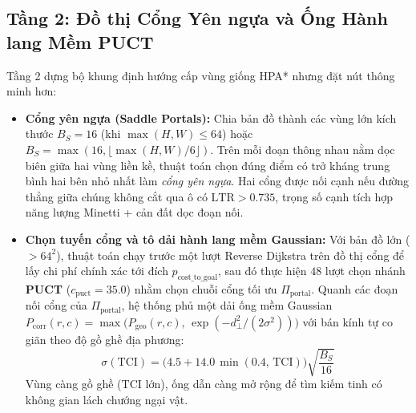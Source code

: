 \documentclass[12pt, a4paper]{article}
\begin{document}
\subsection{Tầng 2: Đồ thị Cổng Yên ngựa và Ống Hành lang Mềm PUCT}
Tầng 2 dựng bộ khung định hướng cấp vùng giống HPA* \cite{botea2004} nhưng đặt nút thông minh hơn:
\begin{itemize}
    \item \textbf{Cổng yên ngựa (Saddle Portals):} Chia bản đồ thành các vùng lớn kích thước $B_S = 16$ (khi $\max(H,W) \le 64$) hoặc $B_S = \max(16, \lfloor \max(H,W)/6 \rfloor)$. Trên mỗi đoạn thông nhau nằm dọc biên giữa hai vùng liền kề, thuật toán chọn đúng điểm có trở kháng trung bình hai bên nhỏ nhất làm \textit{cổng yên ngựa}. Hai cổng được nối cạnh nếu đường thẳng giữa chúng không cắt qua ô có $\text{LTR} > 0.735$, trọng số cạnh tích hợp năng lượng Minetti + cản đất dọc đoạn nối.
    \item \textbf{Chọn tuyến cổng và tô dải hành lang mềm Gaussian:} Với bản đồ lớn ($>64^2$), thuật toán chạy trước một lượt Reverse Dijkstra \cite{dijkstra1959} trên đồ thị cổng để lấy chi phí chính xác tới đích $p_{\text{cost\_to\_goal}}$, sau đó thực hiện $48$ lượt chọn nhánh \textbf{PUCT} ($c_{\text{puct}} = 35.0$) \cite{rosin2011, silver2017} nhằm chọn chuỗi cổng tối ưu $\Pi_{\text{portal}}$. Quanh các đoạn nối cổng của $\Pi_{\text{portal}}$, hệ thống phủ một dải ống mềm Gaussian $P_{\text{corr}}(r,c) = \max\big(P_{\text{geo}}(r,c),\, \exp(-d_{\perp}^2 / (2\sigma^2))\big)$ với bán kính tự co giãn theo độ gồ ghề địa phương:
    \begin{equation}
        \sigma(\text{TCI}) = \big(4.5 + 14.0\,\min(0.4,\, \text{TCI})\big)\sqrt{\frac{B_S}{16}}
        \label{eq:adaptive_tube}
    \end{equation}
    Vùng càng gồ ghề ($\text{TCI}$ lớn), ống dẫn càng mở rộng để tìm kiếm tinh có không gian lách chướng ngại vật.
\end{itemize}
\end{document}

